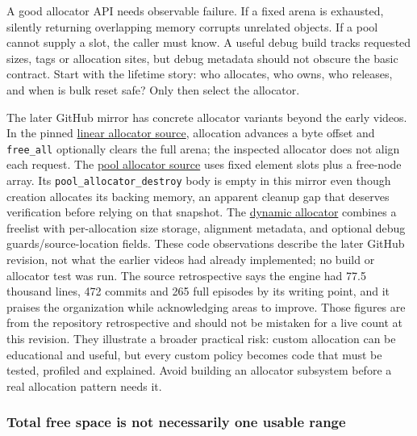 A good allocator API needs observable failure. If a fixed arena is exhausted, silently returning overlapping memory corrupts unrelated objects. If a pool cannot supply a slot, the caller must know. A useful debug build tracks requested sizes, tags or allocation sites, but debug metadata should not obscure the basic contract. Start with the lifetime story: who allocates, who owns, who releases, and when is bulk reset safe? Only then select the allocator.

The later GitHub mirror has concrete allocator variants beyond the early videos. In the pinned \href{https://github.com/travisvroman/kohi/blob/05a5193d5ed4890703cfcbbeb5c5e947feefecf6/kohi.core/src/memory/allocators/linear_allocator.c}{linear allocator source}, allocation advances a byte offset and \texttt{free\_all} optionally clears the full arena; the inspected allocator does not align each request. The \href{https://github.com/travisvroman/kohi/blob/05a5193d5ed4890703cfcbbeb5c5e947feefecf6/kohi.core/src/memory/allocators/pool_allocator.c}{pool allocator source} uses fixed element slots plus a free-node array. Its \texttt{pool\_allocator\_destroy} body is empty in this mirror even though creation allocates its backing memory, an apparent cleanup gap that deserves verification before relying on that snapshot. The \href{https://github.com/travisvroman/kohi/blob/05a5193d5ed4890703cfcbbeb5c5e947feefecf6/kohi.core/src/memory/allocators/dynamic_allocator.c}{dynamic allocator} combines a freelist with per-allocation size storage, alignment metadata, and optional debug guards/source-location fields. These code observations describe the later GitHub revision, not what the earlier videos had already implemented; no build or allocator test was run. The source retrospective says the engine had 77.5 thousand lines, 472 commits and 265 full episodes by its writing point, and it praises the organization while acknowledging areas to improve. Those figures are from the repository retrospective and should not be mistaken for a live count at this revision. They illustrate a broader practical risk: custom allocation can be educational and useful, but every custom policy becomes code that must be tested, profiled and explained. Avoid building an allocator subsystem before a real allocation pattern needs it.

\subsubsection{Total free space is not necessarily one usable range}\label{05-engine-i-ch014-total-free-space-is-not-necessarily-one-usable-range}

